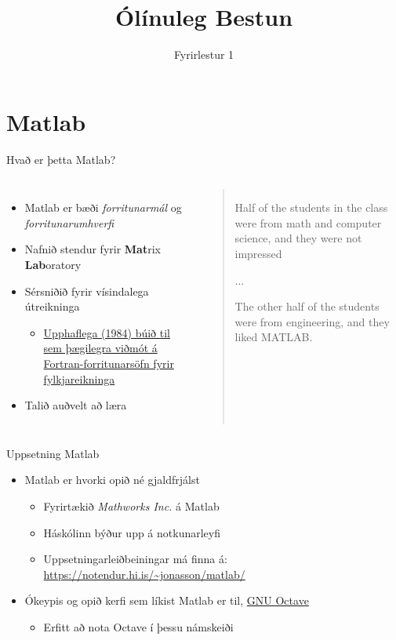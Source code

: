 \documentclass{beamer}
\title{Ólínuleg Bestun}
\subtitle{Fyrirlestur 1}
\begin{document}
\begin{frame}
\titlepage
\end{frame}

\section{Matlab}

\begin{frame}{Hvað er þetta Matlab?}
    \begin{columns}
        \begin{itemize}
            \item Matlab er bæði \emph{forritunarmál} og \emph{forritunarumhverfi}
            \item Nafnið stendur fyrir \textbf{Mat}rix \textbf{Lab}oratory
            \item Sérsniðið fyrir vísindalega útreikninga
            \begin{itemize}
                \item \href{http://se.mathworks.com/company/newsletters/articles/the-origins-of-matlab.html}{Upphaflega (1984) búið til sem þægilegra viðmót á Fortran-forritunarsöfn fyrir fylkjareikninga}
            \end{itemize}
            \item Talið auðvelt að læra
        \end{itemize}
        \begin{quote}
            Half of the students in the class were from math and computer science, and they were not impressed 
        
            ...
            
            The other half of the students were from engineering, and they liked MATLAB.
        \end{quote}
    \end{columns}
\end{frame}

\begin{frame}{Uppsetning Matlab}
    \begin{itemize}
    \item Matlab er hvorki opið né gjaldfrjálst
    \begin{itemize}
        \item Fyrirtækið \emph{Mathworks Inc.} á Matlab
        \item Háskólinn býður upp á notkunarleyfi
        \item Uppsetningarleiðbeiningar má finna á: \url{https://notendur.hi.is/\~jonasson/matlab/}
    \end{itemize}
        \item Ókeypis og opið kerfi sem líkist Matlab er til, \href{https://www.gnu.org/software/octave/}{GNU Octave}
        \begin{itemize}
            \item Erfitt að nota Octave í þessu námskeiði
        \end{itemize}
    \end{itemize}
\end{frame}
\end{document}
